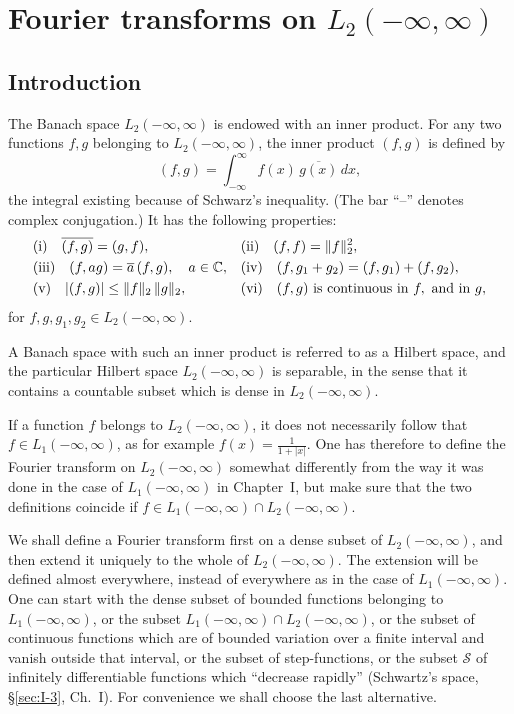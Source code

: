 \chapter{Fourier transforms on \texorpdfstring{$L_2(-\infty,\infty)$}{L2(-infinity, infinity)}}
\label{ch:II}

\setcounter{section}{0}
\section{Introduction}
\label{sec:II-1}

The Banach space $L_{2}(-\infty,\infty)$ is endowed with an inner product. For any two functions $f,g$ belonging to $L_{2}(-\infty,\infty)$, the inner product $(f,g)$ is defined by
\begin{equation}\tag{1.1}\label{eq:II-1.1}
(f,g)=\int_{-\infty}^{\infty}f(x)\,\overline{g(x)}\,dx,
\end{equation}
the integral existing because of Schwarz's inequality. (The bar ``--'' denotes complex conjugation.) It has the following properties:
\begin{align*}
&\text{(i)}\quad \overline{(f,g)}=(g,f), && \text{(ii)}\quad (f,f)=\|f\|_{2}^{2},\\
&\text{(iii)}\quad (f,ag)=\overline{a}\,(f,g),\quad a\in\mathbb{C}, && \text{(iv)}\quad (f,g_{1}+g_{2})=(f,g_{1})+(f,g_{2}),\\
&\text{(v)}\quad |(f,g)|\le \|f\|_{2}\,\|g\|_{2}, && \text{(vi)}\quad (f,g)\text{ is continuous in }f,\text{ and in }g,
\end{align*}
for $f,g,g_{1},g_{2}\in L_{2}(-\infty,\infty)$.

A Banach space with such an inner product is referred to as a Hilbert space, and the particular Hilbert space $L_{2}(-\infty,\infty)$ is separable, in the sense that it contains a countable subset which is dense in $L_{2}(-\infty,\infty)$.

If a function $f$ belongs to $L_{2}(-\infty,\infty)$, it does not necessarily follow that $f\in L_{1}(-\infty,\infty)$, as for example $f(x)=\frac{1}{1+|x|}$. One has therefore to define the Fourier transform on $L_{2}(-\infty,\infty)$ somewhat differently from the way it was done in the case of $L_{1}(-\infty,\infty)$ in Chapter~I, but make sure that the two definitions coincide if $f\in L_{1}(-\infty,\infty)\cap L_{2}(-\infty,\infty)$.

We shall define a Fourier transform first on a dense subset of $L_{2}(-\infty,\infty)$, and then extend it uniquely to the whole of $L_{2}(-\infty,\infty)$. The extension will be defined almost everywhere, instead of everywhere as in the case of $L_{1}(-\infty,\infty)$. One can start with the dense subset of bounded functions belonging to $L_{1}(-\infty,\infty)$, or the subset $L_{1}(-\infty,\infty)\cap L_{2}(-\infty,\infty)$, or the subset of continuous functions which are of bounded variation over a finite interval and vanish outside that interval, or the subset of step-functions, or the subset $\mathcal S$ of infinitely differentiable functions which ``decrease rapidly'' (Schwartz's space, \S\ref{sec:I-3}, Ch.~I). For convenience we shall choose the last alternative.

